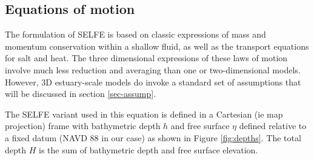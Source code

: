 \subsection{Equations of motion}\label{sec-1}
The formulation of SELFE is based on classic expressions of mass and momentum conservation within a shallow fluid,
as well as the transport equations for salt and heat. The three dimensional expressions of these laws of motion
involve much less reduction and averaging than one or two-dimensional models. However, 3D estuary-scale models
do invoke a standard set of assumptions that will be discussed in section \ref{sec-assump}.

The SELFE variant used in this equation is defined in a Cartesian (ie map projection) frame with
bathymetric depth $h$ and free surface $\eta$ defined relative to a fixed datum (NAVD 88 in our case) as shown 
in Figure \ref{fig:depths}. The total depth $H$ is the sum of bathymetric depth and free surface elevation.



